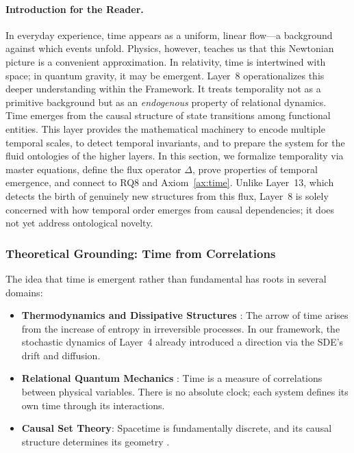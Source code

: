 \paragraph{Introduction for the Reader.}
In everyday experience, time appears as a uniform, linear flow—a background against which events unfold. Physics, however, teaches us that this Newtonian picture is a convenient approximation. In relativity, time is intertwined with space; in quantum gravity, it may be emergent. Layer~8 operationalizes this deeper understanding within the \Apeiron{} Framework. It treats temporality not as a primitive background but as an \emph{endogenous} property of relational dynamics. Time emerges from the causal structure of state transitions among functional entities. This layer provides the mathematical machinery to encode multiple temporal scales, to detect temporal invariants, and to prepare the system for the fluid ontologies of the higher layers. In this section, we formalize temporality via master equations, define the flux operator $\Delta$, prove properties of temporal emergence, and connect to RQ8 and Axiom~\ref{ax:time}.
Unlike Layer~13, which detects the birth of genuinely new structures from this flux, Layer~8 is solely concerned with how temporal order emerges from causal dependencies; it does not yet address ontological novelty.

\subsubsection{Theoretical Grounding: Time from Correlations}
The idea that time is emergent rather than fundamental has roots in several domains:

\begin{itemize}
    \item \textbf{Thermodynamics and Dissipative Structures} \cite{prigogine1984}: The arrow of time arises from the increase of entropy in irreversible processes. In our framework, the stochastic dynamics of Layer~4 already introduced a direction via the SDE's drift and diffusion.
    \item \textbf{Relational Quantum Mechanics} \cite{rovelli1996}: Time is a measure of correlations between physical variables. There is no absolute clock; each system defines its own time through its interactions.
    \item \textbf{Causal Set Theory}: Spacetime is fundamentally discrete, and its causal structure determines its geometry \cite{sorkin2005causal}.
\end{itemize}

